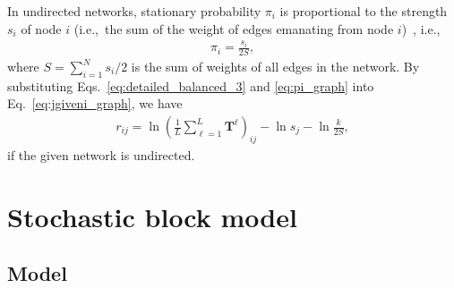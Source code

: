 \documentclass[12pt]{article} %
\def\ie{i.e.,~}
\def\mat#1{\mathbf{#1}}
\begin{document}
In undirected networks, stationary probability $\pi_i$ is proportional to the strength $s_i$ of node $i$ (\ie the sum of the weight of edges emanating from node $i$)~\cite{Masuda2017}, \ie
\begin{align}
    \label{eq:pi_graph}
    \pi_i = \frac{s_i}{2S},
\end{align}
where $S = \sum_{i=1}^N s_i /2$ is the sum of weights of all edges in the network.
By substituting Eqs.~\eqref{eq:detailed_balanced_3} and \eqref{eq:pi_graph} into Eq.~\eqref{eq:jgiveni_graph}, we have
\begin{align}
    \label{eq:opt_dotsim_undirected_graph}
    r_{ij} = \ln \left(\frac{1}{L}\sum_{\ell=1}^L \mat{T}^\ell\right)_{ij} - \ln s_j -\ln \frac{k}{2S},
\end{align}
if the given network is undirected.

\section{Stochastic block model}
\label{sec:sbm}

\subsection{Model}
\end{document}
